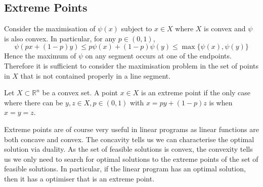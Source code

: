 \subsection{Extreme Points}
Consider the maximisation of $\psi(x)$ subject to $x\in X$ where $X$ is convex and $\psi$ is also convex.
In particular, for any $p\in(0,1)$,
$$\psi(px+(1-p)y)\le p\psi(x)+(1-p)\psi(y)\le\max\{\psi(x),\psi(y)\}$$
Hence the maximum of $\psi$ on any segment occurs at one of the endpoints.
Therefore it is sufficient to consider the maximisation problem in the set of points in $X$ that is not contained properly in a line segment.
\begin{definition}
    Let $X\subset\mathbb R^n$ be a convex set.
    A point $x\in X$ is an extreme point if the only case where there can be $y,z\in X,p\in (0,1)$ with $x=py+(1-p)z$ is when $x=y=z$.
\end{definition}
Extreme points are of course very useful in linear programs as linear functions are both concave and convex.
The concavity tells us we can characterise the optimal solution via duality.
As the set of feasible solutions is convex, the convexity tells us we only need to search for optimal solutions to the extreme points of the set of feasible solutions.
In particular, if the linear program has an optimal solution, then it has a optimiser that is an extreme point.
